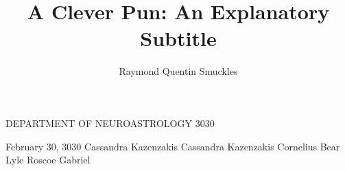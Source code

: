 \documentclass[dissertation,notoc,openany]{tufte-book}
\title{A Clever Pun: An Explanatory Subtitle}
\author{Raymond Quentin Smuckles}
\begin{document}
\begin{fullwidth}
\maketitlepage
{DEPARTMENT OF NEUROASTROLOGY}	%
{3030}

\approval
{February 30, 3030}		%
{Cassandra Kazenzakis}		%
{Cassandra Kazenzakis}		%
{Cornelius Bear}		%
{Lyle Roscoe Gabriel}	%

\statementbyauthor
\statementbyauthor %



\tableofcontents

\listoffigures

\listoftables


\end{fullwidth}


%
%

\appendix


\backmatter

\begin{fullwidth}
\setcounter{page}{91}

\end{fullwidth}
\end{document}
